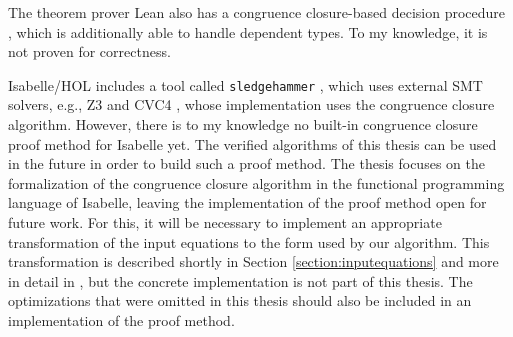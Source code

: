 The theorem prover Lean also has a congruence closure-based decision procedure \cite{congruenceclosure-lean}, which is additionally able to handle dependent types. To my knowledge, it is not proven for correctness.

Isabelle/HOL includes a tool called \lstinline|sledgehammer| \cite{sledgehammer}, which uses external SMT solvers, e.g., Z3 \cite{z3} and CVC4 \cite{cvc4}, whose implementation uses the congruence closure algorithm.
However, there is to my knowledge no built-in congruence closure proof method for Isabelle yet.
The verified algorithms of this thesis can be used in the future in order to build such a proof method.
The thesis focuses on the formalization of the congruence closure algorithm in the functional programming language of Isabelle, leaving the implementation of the proof method open for future work.
For this, it will be necessary to implement an appropriate transformation of the input equations to the form used by our algorithm.
This transformation is described shortly in Section \ref{section:inputequations} and more in detail in \cite{Nieuwenhuis}, but the concrete implementation is not part of this thesis.
The optimizations that were omitted in this thesis should also be included in an implementation of the proof method.
